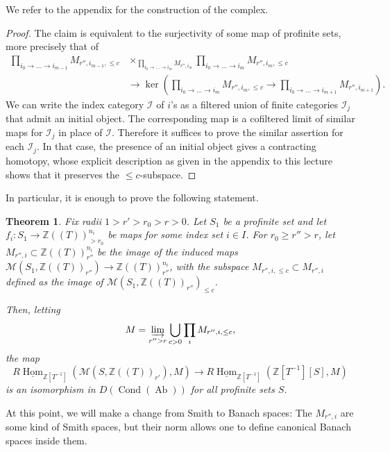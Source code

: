 \documentclass[11pt]{amsbook}
\DeclareMathOperator{\Hom}{Hom}
\newcommand{\intHom}{\underline{\Hom}}
\DeclareMathOperator{\Cond}{Cond}
\DeclareMathOperator{\Ab}{Ab}
\numberwithin{equation}{section}
\newtheorem{theorem}{Theorem}
\numberwithin{theorem}{section}
\theoremstyle{definition}
\begin{document}
We refer to the appendix for the construction of the complex.

\begin{proof} The claim is equivalent to the surjectivity of some map of profinite sets, more precisely that of
\[\begin{aligned}
\prod_{i_0\to\ldots\to i_{m-1}} M_{r'',i_{m-1},\leq c}&\times_{\prod_{i_0\to\ldots\to i_m} M_{r'',i_m}} \prod_{i_0\to\ldots\to i_m} M_{r'',i_m,\leq c}\\
&\to \ker(\prod_{i_0\to\ldots\to i_m} M_{r'',i_m,\leq c}\to \prod_{i_0\to\ldots\to i_{m+1}} M_{r'',i_{m+1}}).
\end{aligned}\]
We can write the index category $\mathcal I$ of $i$'s as a filtered union of finite categories $\mathcal I_j$ that admit an initial object. The corresponding map is a cofiltered limit of similar maps for $\mathcal I_j$ in place of $\mathcal I$. Therefore it suffices to prove the similar assertion for each $\mathcal I_j$. In that case, the presence of an initial object gives a contracting homotopy, whose explicit description as given in the appendix to this lecture shows that it preserves the $\leq c$-subspace.
\end{proof}

In particular, it is enough to prove the following statement.

\begin{theorem} Fix radii $1>r'>r_0>r>0$. Let $S_1$ be a profinite set and let $f_i: S_1\to \mathbb Z((T))_{>r_0}^{n_i}$ be maps for some index set $i\in I$. For $r_0\geq r''>r$, let $M_{r'',i}\subset \mathbb Z((T))_{r''}^{n_i}$ be the image of the induced maps $\mathcal M(S_1,\mathbb Z((T))_{r''})\to \mathbb Z((T))_{r''}^{n_i}$, with the subspace $M_{r'',i,\leq c}\subset M_{r'',i}$ defined as the image of $\mathcal M(S_1,\mathbb Z((T))_{r''})_{\leq c}$.

Then, letting
\[
M=\varinjlim_{r''>r} \bigcup_{c>0} \prod_i M_{r'',i,\leq c},
\]
the map
\[
R\intHom_{\mathbb Z[T^{-1}]}(\mathcal M(S,\mathbb Z((T))_{r'}),M)\to R\intHom_{\mathbb Z[T^{-1}]}(\mathbb Z[T^{-1}][S],M)
\]
is an isomorphism in $D(\Cond(\Ab))$ for all profinite sets $S$.
\end{theorem}

At this point, we will make a change from Smith to Banach spaces: The $M_{r'',i}$ are some kind of Smith spaces, but their norm allows one to define canonical Banach spaces inside them.
\end{document}
